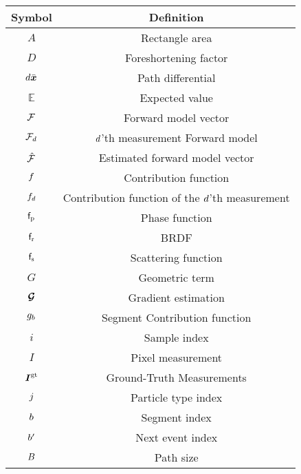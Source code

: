 \begingroup
\renewcommand\arraystretch{1.4}
\begin{center}
\begin{longtable}[c]{|c|c|} 
 \hline
 Symbol & Definition \\
 \hline
 \hline
 
$A$ & Rectangle area \\ \hline




$D$ & Foreshortening factor \\ \hline
$d\Bar{\boldsymbol{x}}$ & Path differential \\ \hline 

$\mathbb{E}$ & Expected value \\ \hline

$\mathcal{F}$ & Forward model vector \\ \hline
$\mathcal{F}_{d}$ & $d$'th measurement Forward model \\ \hline
$\hat{\mathcal{F}}$ & Estimated forward model vector\\ \hline
$f$ & Contribution function\\ \hline
$f_{d}$ & Contribution function of the $d$'th measurement\\ \hline
$\mathsf{f}_{\text{p}}$ & Phase function\\ \hline
$\mathsf{f}_{\text{r}}$ & \ac{BRDF}\\ \hline
$\mathsf{f}_{\text{s}}$ & Scattering function\\ \hline
 
$G$ & Geometric term\\ \hline
$\boldsymbol{\mathcal{G}}$ & Gradient estimation \\ \hline
$g_{b}$ & Segment Contribution function \\ \hline


$i$ & Sample index \\ \hline
$I$ & Pixel measurement\\ \hline
$\boldsymbol{I}^{\text{gt}}$ & Ground-Truth Measurements \\ \hline 

$j$ & Particle type index \\ \hline

$b$ & Segment index \\ \hline
$b'$ & Next event index \\ \hline
$B$ & Path size \\ \hline


\end{longtable}
\end{center}
